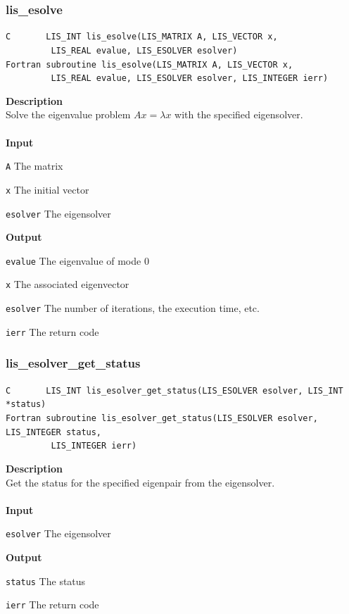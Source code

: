 \documentclass[a4paper]{article}
\newcommand{\namelistlabel}[1]{\mbox{#1}\hfill}
\newenvironment{namelist}[1]{%
\begin{list}{}
  {\let\makelabel\namelistlabel
  \settowidth{\labelwidth}{#1}
  \setlength{\leftmargin}{1.1\labelwidth}}
  }{%
\end{list}}
\begin{document}
\subsubsection{lis\_esolve}
\begin{screen}
\verb|C       LIS_INT lis_esolve(LIS_MATRIX A, LIS_VECTOR x,|\\ 
\verb|         LIS_REAL evalue, LIS_ESOLVER esolver)|\\
\verb|Fortran subroutine lis_esolve(LIS_MATRIX A, LIS_VECTOR x,|\\
\verb|         LIS_REAL evalue, LIS_ESOLVER esolver, LIS_INTEGER ierr)|
\end{screen}
{\bf Description}\\
\indent
Solve the eigenvalue problem $Ax = \lambda x$ with the specified eigensolver.
\\ \\
\noindent
{\bf Input}
\begin{namelist}{XXXXXXXXXXXXXXXXXXXX}
\item[\tt A] The matrix
\item[\tt x] The initial vector
\item[\tt esolver] The eigensolver
\end{namelist}
{\bf Output}
\begin{namelist}{XXXXXXXXXXXXXXXXXXXX}
\item[\tt evalue] The eigenvalue of mode 0
\item[\tt x] The associated eigenvector
\item[\tt esolver] The number of iterations, the execution time, etc.
\item[\tt ierr] The return code
\end{namelist}

\newpage
\subsubsection{lis\_esolver\_get\_status}
\begin{screen}
\verb|C       LIS_INT lis_esolver_get_status(LIS_ESOLVER esolver, LIS_INT *status)|\\
\verb|Fortran subroutine lis_esolver_get_status(LIS_ESOLVER esolver, LIS_INTEGER status,|\\
\verb|         LIS_INTEGER ierr)|
\end{screen}
{\bf Description}\\
\indent
Get the status for the specified eigenpair from the eigensolver.
\\ \\
\noindent
{\bf Input}
\begin{namelist}{XXXXXXXXXXXXXXXXXXXX}
\item[\tt esolver] The eigensolver
\end{namelist}
{\bf Output}
\begin{namelist}{XXXXXXXXXXXXXXXXXXXX}
\item[\tt status] The status
\item[\tt ierr] The return code
\end{namelist}
\end{document}
